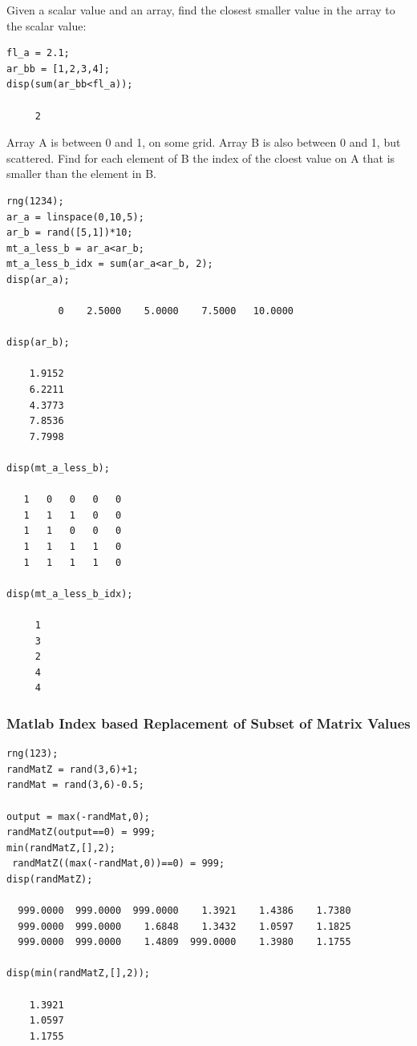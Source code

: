 \documentclass[
]{book}
\begin{document}
Given a scalar value and an array, find the closest smaller value in the
array to the scalar value:

\begin{verbatim}
fl_a = 2.1;
ar_bb = [1,2,3,4];
disp(sum(ar_bb<fl_a));

     2
\end{verbatim}

Array A is between 0 and 1, on some grid. Array B is also between 0 and
1, but scattered. Find for each element of B the index of the cloest
value on A that is smaller than the element in B.

\begin{verbatim}
rng(1234);
ar_a = linspace(0,10,5);
ar_b = rand([5,1])*10;
mt_a_less_b = ar_a<ar_b;
mt_a_less_b_idx = sum(ar_a<ar_b, 2);
disp(ar_a);

         0    2.5000    5.0000    7.5000   10.0000

disp(ar_b);

    1.9152
    6.2211
    4.3773
    7.8536
    7.7998

disp(mt_a_less_b);

   1   0   0   0   0
   1   1   1   0   0
   1   1   0   0   0
   1   1   1   1   0
   1   1   1   1   0

disp(mt_a_less_b_idx);

     1
     3
     2
     4
     4
\end{verbatim}

\hypertarget{matlab-index-based-replacement-of-subset-of-matrix-values}{%
\subsubsection{Matlab Index based Replacement of Subset of Matrix Values}\label{matlab-index-based-replacement-of-subset-of-matrix-values}}

\begin{verbatim}
rng(123);
randMatZ = rand(3,6)+1;
randMat = rand(3,6)-0.5;
 
output = max(-randMat,0);
randMatZ(output==0) = 999;
min(randMatZ,[],2);
 randMatZ((max(-randMat,0))==0) = 999;
disp(randMatZ);

  999.0000  999.0000  999.0000    1.3921    1.4386    1.7380
  999.0000  999.0000    1.6848    1.3432    1.0597    1.1825
  999.0000  999.0000    1.4809  999.0000    1.3980    1.1755

disp(min(randMatZ,[],2));

    1.3921
    1.0597
    1.1755
\end{verbatim}
\end{document}

